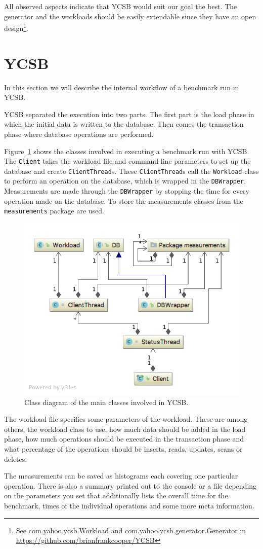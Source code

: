 All observed aspects indicate that YCSB would suit our goal the best.
The generator and the workloads should be easily extendable since they have an open design\footnote{See com.yahoo.ycsb.Workload and com.yahoo.ycsb.generator.Generator in \url{https://github.com/brianfrankcooper/YCSB}}.

\section{YCSB}
\label{ch:analysis:se:ycsb}
In this section we will describe the internal workflow of a benchmark run in YCSB.

YCSB separated the execution into two parts.
The first part is the load phase in which the initial data is written to the database.
Then comes the transaction phase where database operations are performed.

Figure~\ref{fig:basicYCSBWorkflow} shows the classes involved in executing a benchmark run with YCSB.
The \texttt{Client} takes the workload file and command-line parameters to set up the database and create \texttt{ClientThread}s.
These \texttt{ClientThread}s call the \texttt{Workload} class to perform an operation on the database,
which is wrapped in the \texttt{DBWrapper}.
Measurements are made through the \texttt{DBWrapper} by stopping the time for every operation made on the database.
To store the measurements classes from the \texttt{measurements} package are used.

\begin{figure}[h!]
  \centering
  \includegraphics[width=.75\textwidth]{images/benchmarks/basicYCSBWorkflow}
  \caption{Class diagram of the main classes involved in YCSB.}
  \label{fig:basicYCSBWorkflow}
\end{figure}

The workload file specifies some parameters of the workload.
These are among others,
the workload class to use,
how much data should be added in the load phase,
how much operations should be executed in the transaction phase and what percentage of the operations should be inserts, reads, updates, scans or deletes.

The measurements can be saved as histograms each covering one particular operation.
There is also a summary printed out to the console or a file depending on the parameters you set that additionally lists the overall time for the benchmark, times of the individual operations and some more meta information.

